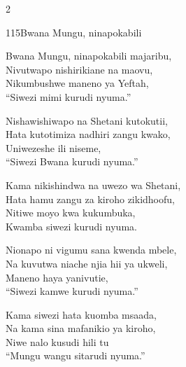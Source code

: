 \begin{multicols}{2}
\begin{hymn}{115}{Bwana Mungu, ninapokabili}{}
\begin{stanza}
Bwana Mungu, ninapokabili majaribu,\\
Nivutwapo nishirikiane na maovu,\\
Nikumbushwe maneno ya Yeftah,\\
``Siwezi mimi kurudi nyuma.''
\end{stanza}
\begin{stanza}
Nishawishiwapo na Shetani kutokutii,\\
Hata kutotimiza nadhiri zangu kwako,\\
Uniwezeshe ili niseme,\\
``Siwezi Bwana kurudi nyuma.''
\end{stanza}
\begin{stanza}
Kama nikishindwa na uwezo wa Shetani,\\
Hata hamu zangu za kiroho zikidhoofu,\\
Nitiwe moyo kwa kukumbuka,\\
Kwamba siwezi kurudi nyuma.
\end{stanza}
\begin{stanza}
Nionapo ni vigumu sana kwenda mbele,\\
Na kuvutwa niache njia hii ya ukweli,\\
Maneno haya yanivutie,\\
``Siwezi kamwe kurudi nyuma.''
\end{stanza}
\begin{stanza}
Kama siwezi hata kuomba msaada,\\
Na kama sina mafanikio ya kiroho,\\
Niwe nalo kusudi hili tu\\
``Mungu wangu sitarudi nyuma.''
\end{stanza}
\end{hymn}


\end{multicols}
